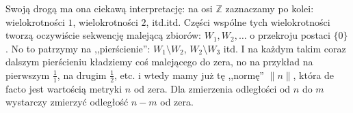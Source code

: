 \documentclass[12pt]{amsart}
\begin{document}
Swoją drogą ma ona ciekawą interpretację:
na osi $\mathbb{Z}$ zaznaczamy po kolei: wielokrotności $1$, wielokrotności $2$, itd.itd.
Części wspólne tych wielokrotności tworzą oczywiście sekwencję malejącą 
zbiorów: $W_1, W_2, \ldots$ o przekroju postaci $\{0\}$. 
No to patrzymy na ,,pierścienie'': $W_1 \setminus W_2$, $W_2 \setminus W_3$ itd.
I na każdym takim coraz dalszym pierścieniu kładziemy coś malejącego do zera,
no na przykład na pierwszym $\frac{1}{1}$, na drugim $\frac{1}{2}$, etc.
i wtedy mamy już tę ,,normę'' $\|n\|$, która de facto jest wartością metryki $n$ od zera. 
Dla zmierzenia odległości od $n$ do $m$ wystarczy zmierzyć odległość $n-m$ od zera.
\end{document}

